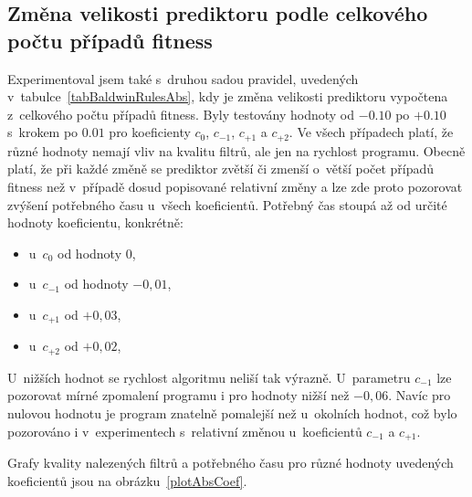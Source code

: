 \subsection{Změna velikosti prediktoru podle celkového počtu případů fitness}

Experimentoval jsem také s~druhou sadou pravidel, uvedených v~tabulce~\ref{tabBaldwinRulesAbs}, kdy je změna velikosti prediktoru vypočtena z~celkového počtu případů fitness. Byly testovány hodnoty od $-0.10$ po $+0.10$ s~krokem po $0.01$ pro koeficienty $c_0$, $c_{-1}$, $c_{+1}$ a $c_{+2}$. Ve všech případech platí, že různé hodnoty nemají vliv na kvalitu filtrů, ale jen na rychlost programu. Obecně platí, že při každé změně se prediktor zvětší či zmenší o~větší počet případů fitness než v~případě dosud popisované relativní změny a lze zde proto pozorovat zvýšení potřebného času u~všech koeficientů. Potřebný čas stoupá až od určité hodnoty koeficientu, konkrétně:

\begin{itemize}
    \item u~$c_0$ od hodnoty $0$,
    \item u~$c_{-1}$ od hodnoty $-0,01$,
    \item u~$c_{+1}$ od $+0,03$,
    \item u~$c_{+2}$ od $+0,02$,
\end{itemize}

U~nižších hodnot se rychlost algoritmu neliší tak výrazně. U~parametru $c_{-1}$  lze pozorovat mírné zpomalení programu i pro hodnoty nižší než $-0,06$. Navíc pro nulovou hodnotu je program znatelně pomalejší než u~okolních hodnot, což bylo pozorováno i v~experimentech s~relativní změnou u~koeficientů $c_{-1}$ a $c_{+1}$.

Grafy kvality nalezených filtrů a potřebného času pro různé hodnoty uvedených koeficientů jsou na obrázku~\ref{plotAbsCoef}.

